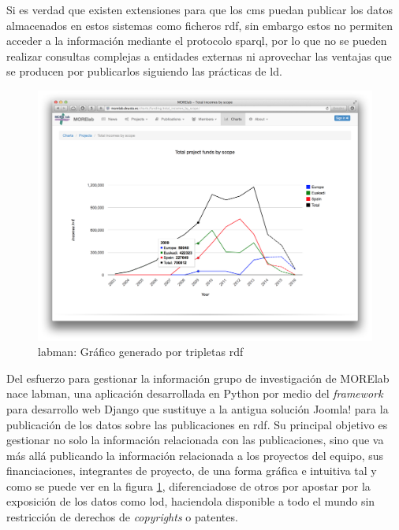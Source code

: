 Si es verdad que existen extensiones para que los \acrshort{cms} puedan publicar los datos almacenados en estos sistemas como ficheros \acrfull{rdf}, sin embargo estos no permiten acceder a la información mediante el protocolo \acrshort{sparql}, por lo que no se pueden realizar consultas complejas a entidades externas ni aprovechar las ventajas que se producen por publicarlos siguiendo las prácticas de \acrfull{ld}.

\begin{figure}[!htp]
	\centering
	\includegraphics[scale=0.21]{fig/labman-chart}
	\caption{\acrshort{labman}: Gráfico generado por tripletas \acrshort{rdf}}\label{fig:labmanchart}
\end{figure}

Del esfuerzo para gestionar la información grupo de investigación de MORElab nace \acrshort{labman}, una aplicación desarrollada en Python\cite{Python} por medio del \textit{framework} para desarrollo web Django\cite{Django} que sustituye a la antigua solución Joomla! para la publicación de los datos sobre las publicaciones en \acrfull{rdf}\cite{RDF}. Su principal objetivo es gestionar no solo la información relacionada con las publicaciones, sino que va más allá publicando la información relacionada a los proyectos del equipo, sus financiaciones, integrantes de proyecto, de una forma gráfica e intuitiva tal y como se puede ver en la figura \ref{fig:labmanchart}, diferenciadose de otros  por apostar por la exposición de los datos como \acrlong{lod}\cite{linkeddata}, haciendola disponible a todo el mundo sin restricción de derechos de \textit{copyrights} o patentes.\cite{pena_visual_2014}
